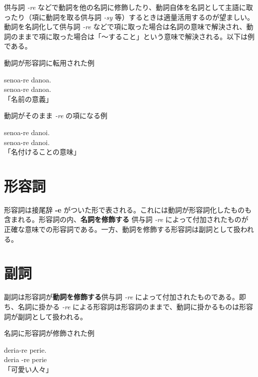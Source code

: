 供与詞 \emph{-re} などで動詞を他の名詞に修飾したり、動詞自体を名詞として主語に取ったり（項に動詞を取る供与詞 \emph{-sy} 等）するときは適量活用するのが望ましい。動詞を名詞化して供与詞 \emph{-re} などで項に取った場合は名詞の意味で解決され、動詞のままで項に取った場合は「～すること」という意味で解決される。以下は例である。

\begin{itembox}[l]{動詞が形容詞に転用された例}
    \begin{pindent}
        \noindent
        senoa-re danoa. \\
        senoa-re danoa. \\
        「名前の意義」
    \end{pindent}
\end{itembox}

\begin{itembox}[l]{動詞がそのまま \emph{-re} の項になる例}
    \begin{pindent}
        senoa-re danoi. \\
        senoa-re danoi. \\
        「名付けることの意味」
        \noindent
    \end{pindent}
\end{itembox}

\section{形容詞}

形容詞は接尾辞 \textbf{-e} がついた形で表される。これには動詞が形容詞化したものも含まれる。形容詞の内、\textbf{名詞を修飾する} 供与詞 \emph{-re} によって付加されたものが正確な意味での形容詞である。一方、動詞を修飾する形容詞は副詞として扱われる。

\section{副詞}

副詞は形容詞が\textbf{動詞を修飾する}供与詞 \emph{-re} によって付加されたものである。即ち、名詞に掛かる \emph{-re} による形容詞は形容詞のままで、動詞に掛かるものは形容詞が副詞として扱われる。

\begin{itembox}[l]{名詞に形容詞が修飾された例}
    \begin{pindent}
        \noindent
        deria-re perie. \vspace{-1mm} \\
        deria -re perie \vspace{-1mm} \\
        「可愛い人々」
    \end{pindent}
\end{itembox}

